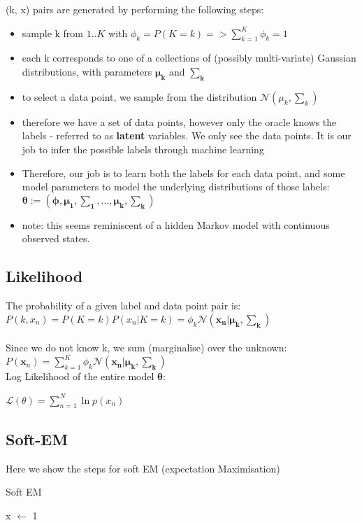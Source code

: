 \documentclass[a4paper]{article}
\begin{document}
	(k, x) pairs are generated by performing the following steps:
	
	\begin{itemize}
		\item sample k from ${1..K}$ with $\phi_k = P(K = k) => \sum_{k=1}^{K}\phi_k = 1$
		\item each k corresponds to one of a collections of (possibly multi-variate) Gaussian distributions, with parameters $\mathbf{\mu_k}$ and $\mathbf{\sum_k}$
		\item to select a data point, we sample from the distribution $\mathcal{N}(\mu_k, \sum_k)$
		\item therefore we have a set of data points, however only the oracle knows the labels - referred to as \textbf{latent} variables. We only see the data points. It is our job to infer the possible labels through machine learning
		\item Therefore, our job is to learn both the labels for each data point, and some model parameters to model the underlying distributions of those labels: $\mathbf{\theta := (\phi, \mu_1, \sum_1, ..., \mu_k, \sum_k)}$
		\item note: this seems reminiscent of a hidden Markov model with continuous observed states.
	\end{itemize}
	
	\subsection{Likelihood}
	The probability of a given label and data point pair is: \\
	$P(k, x_n) = P(K=k)P(x_n | K=k) = \phi_k \mathcal{N}(\mathbf{x_n | \mu_k, \sum_k})$ \\ \\
	Since we do not know k, we sum (marginalise) over the unknown: \\
	$P(\mathbf{x}_n) = \sum_{k=1}^{K}\phi_k \mathcal{N}(\mathbf{x_n| \mu_k, \sum_k})$ \\
	
	Log Likelihood of the entire model $\mathbf{\theta}$:
	
	$\mathcal{L}(\theta) = \sum_{n=1}^N\ln p(x_n)$
	
	
	\subsection{Soft-EM}
	Here we show the steps for soft EM (expectation Maximisation) 
	
	\begin{algorithm}
		\caption{Soft EM}
		\begin{algorithmic}[1]
			 
			
			\State x $\gets$ 1
			
			\EndProcedure
		\end{algorithmic}
	\end{algorithm}
	
\end{document}

